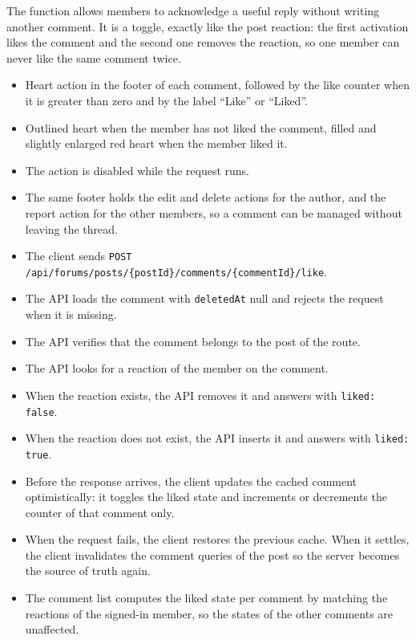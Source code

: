 \noindent The function allows members to acknowledge a useful reply without writing another
comment. It is a toggle, exactly like the post reaction: the first activation likes the comment
and the second one removes the reaction, so one member can never like the same comment twice.

\begin{itemize}[leftmargin=1.6em,topsep=3pt,itemsep=2pt,parsep=0pt,label=$\bullet$]
      \item Heart action in the footer of each comment, followed by the like counter when
            it is greater than zero and by the label ``Like'' or ``Liked''.
      \item Outlined heart when the member has not liked the comment, filled and slightly
            enlarged red heart when the member liked it.
      \item The action is disabled while the request runs.
      \item The same footer holds the edit and delete actions for the author, and the
            report action for the other members, so a comment can be managed without
            leaving the thread.
\end{itemize}

\begin{itemize}[leftmargin=1.6em,topsep=3pt,itemsep=2pt,parsep=0pt,label=$\bullet$]
      \item The client sends \texttt{POST
                  /api/forums/posts/\{postId\}/comments/\{commentId\}/like}.
      \item The API loads the comment with \texttt{deletedAt} null and rejects the request
            when it is missing.
      \item The API verifies that the comment belongs to the post of the route.
      \item The API looks for a reaction of the member on the comment.
      \item When the reaction exists, the API removes it and answers with \texttt{liked:
                  false}.
      \item When the reaction does not exist, the API inserts it and answers with
            \texttt{liked: true}.
      \item Before the response arrives, the client updates the cached comment
            optimistically: it toggles the liked state and increments or decrements the
            counter of that comment only.
      \item When the request fails, the client restores the previous cache. When it
            settles, the client invalidates the comment queries of the post so the server
            becomes the source of truth again.
      \item The comment list computes the liked state per comment by matching the reactions
            of the signed-in member, so the states of the other comments are unaffected.
\end{itemize}


